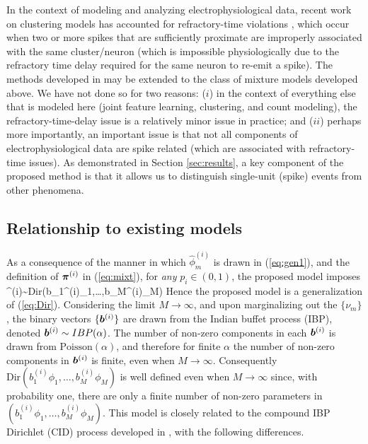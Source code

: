 \documentclass[journal]{IEEEtran}
\begin{document}

In the context of modeling and analyzing electrophysiological data, recent work on clustering models has accounted for refractory-time
violations \cite{Wood2009,Bo2011}, which occur when two or more spikes that
are sufficiently proximate are improperly associated with the same
cluster/neuron (which is impossible physiologically due to the refractory time delay
required for the same neuron to re-emit a spike). The methods developed in \cite{Wood2009,Bo2011} may be extended to the class of mixture models developed above. We have not done so for two reasons: ($i$) in the context of everything else that is modeled here (joint feature learning, clustering, and count modeling), the refractory-time-delay issue is a relatively minor issue in practice; and ($ii$) perhaps more importantly, an important issue is that not all components of electrophysiological data are spike related (which are associated with refractory-time issues). As demonstrated in Section \ref{sec:results}, a key component of the proposed method is that it allows us to distinguish single-unit (spike) events from other phenomena.

\subsection{Relationship to existing models\label{sec:related}}

As a consequence of the manner in which $\hat{\phi}_m^{(i)}$ is drawn in (\ref{eq:gen1}), and the definition of $\boldsymbol{\pi}^{(i)}$ in (\ref{eq:mixt}), for \emph{any} $p_i\in(0,1)$, the proposed model imposes
\beq \piv^{(i)}\sim\mbox{Dir}(b_1^{(i)}{\phi}_1,\dots,b_M^{(i)}{\phi}_M)\eeq
Hence the proposed model is a generalization of (\ref{eq:Dir}). Considering the limit $M\rightarrow\infty$, and upon marginalizing out the $\{\nu_m\}$, the binary vectors $\{\boldsymbol{b}^{(i)}\}$ are drawn from the Indian buffet process (IBP), denoted $\boldsymbol{b}^{(i)}\sim\relax{IBP}(\alpha)$. The number of non-zero components in each $\boldsymbol{b}^{(i)}$ is drawn from $\mbox{Poisson}(\alpha)$, and therefore for finite $\alpha$ the number of non-zero components in $\boldsymbol{b}^{(i)}$ is finite, even when $M\rightarrow\infty$. Consequently $\mbox{Dir}(b_1^{(i)}{\phi}_1,\dots,b_M^{(i)}{\phi}_M)$ is well defined even when $M\rightarrow\infty$ since, with probability one, there are only a finite number of non-zero parameters in $(b_1^{(i)}{\phi}_1,\dots,b_M^{(i)}{\phi}_M)$. This model is closely related to the compound IBP Dirichlet (CID) process developed in \cite{compound}, with the following differences.
\end{document}
